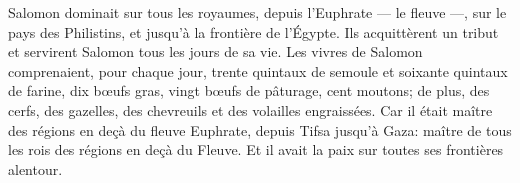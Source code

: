 Salomon dominait sur tous les royaumes, depuis l’Euphrate --- le fleuve ---,
	sur le pays des Philistins, et jusqu’à la frontière de l’Égypte.
Ils acquittèrent un tribut et servirent Salomon tous les jours de sa vie.
Les vivres de Salomon comprenaient, pour chaque jour,
	trente quintaux de semoule et soixante quintaux de farine,
	dix bœufs gras, vingt bœufs de pâturage, cent moutons;
	de plus, des cerfs, des gazelles, des chevreuils et des volailles engraissées.
Car il était maître des régions en deçà du fleuve Euphrate, depuis Tifsa jusqu’à Gaza:
	maître de tous les rois des régions en deçà du Fleuve.
Et il avait la paix sur toutes ses frontières alentour.
